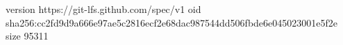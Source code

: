 version https://git-lfs.github.com/spec/v1
oid sha256:cc2fd9d9a666e97ae5c2816ecf2e68dac987544dd506fbde6e045023001e5f2e
size 95311
